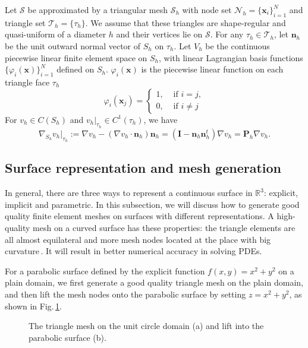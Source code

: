 \documentclass[final,1p,times]{elsarticle}
\newcommand{\bx}{\mathbf{x}}
\newcommand{\calS}{\mathcal{S}}
\begin{document}
Let $\calS$ be approximated by a triangular mesh $\calS_h$ with node set $\mathcal
N_h = \{\bx_i\}_{i=1}^{N}$ and triangle set $\mathcal T_h = \{\tau_h\}$.  We
assume that these triangles are shape-regular and quasi-uniform of a
diameter $h$ and their vertices lie on $\calS$. For any $\tau_h\in \mathcal T_h$,
let $\boldsymbol n_h$ be the unit outward normal vector of $S_h$ on $\tau_h$.
Let $V_h$ be the continuous piecewise linear finite element space on $S_h$,
with linear Lagrangian basis functions $\{\varphi_i(\bx)\}_{i=1}^N$ defined
on $S_h$. $\varphi_i(\bx)$ is the piecewise linear function on each
triangle face $\tau_h$
\begin{equation}\label{eq:varphi}
    \varphi_i(\bx_j) = 
    \begin{cases}
        1,&\text{ if } i=j,\\
        0,&\text{ if } i\not=j
    \end{cases} 
\end{equation}
For $v_h\in C(S_h)$ and $v_h|_{\tau_h}\in C^1(\tau_h)$, we have 
\begin{equation*}
    \nabla_{S_h} v_h|_{\tau_h} := \nabla v_h - (\nabla v_h\cdot\boldsymbol
    n_h)\boldsymbol n_h = (\boldsymbol I - \boldsymbol n_h \boldsymbol
    n_h^t)\nabla v_h = \boldsymbol P_h\nabla v_h.
\end{equation*}


\subsection{Surface representation and mesh generation}

In general, there are three ways to represent a continuous surface in $\mathbb R^3$:
explicit, implicit and parametric. 
In this subsection, we will discuss how to generate good quality
finite element meshes on surfaces with different representations.
A high-quality mesh on a curved surface has these properties:
the triangle elements are all almost equilateral and more mesh
nodes located at the place with big curvature\,\cite{wei2010}.
It will result in better numerical accuracy in solving PDEs. 

For a parabolic surface defined by the explicit function $f(x, y) = x^2 +
y^2$ on a plain domain,  we first generate a good quality triangle mesh on the plain domain, and
then lift the mesh nodes onto the parabolic surface by setting $z
= x^2 +y^2$, as shown in Fig.\,\ref{fig:mesh-Parabolic}. 

\begin{figure}[H]
    \setlength{\captionmargin}{2pt}
    \centering
    \hspace{1cm}
    \caption{The triangle mesh on the unit circle domain (a) and lift
    into the parabolic surface (b).}
    \label{fig:mesh-Parabolic}
\end{figure}
\end{document}
